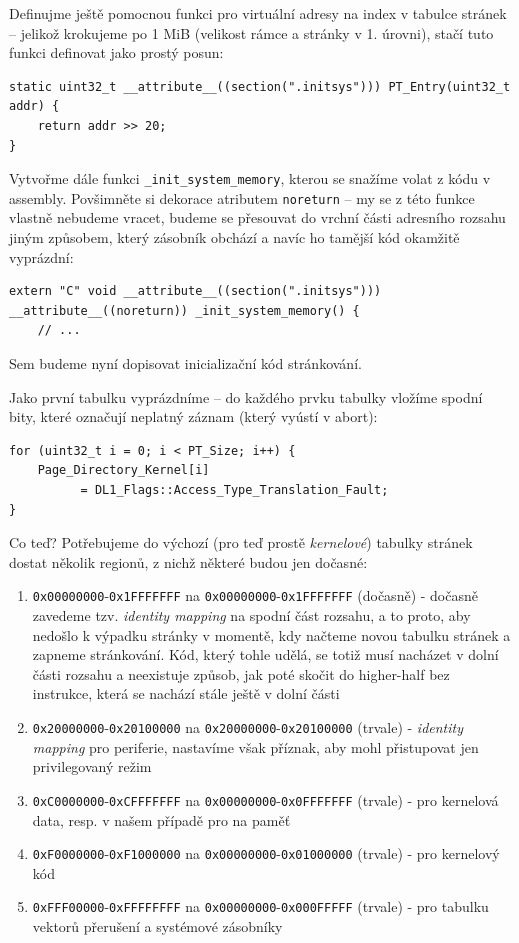 \documentclass{article}
\begin{document}
Definujme ještě pomocnou funkci pro  virtuální adresy na index v tabulce stránek -- jelikož krokujeme po 1 MiB (velikost rámce a stránky v 1. úrovni), stačí tuto funkci definovat jako prostý posun:
\begin{lstlisting}
static uint32_t __attribute__((section(".initsys"))) PT_Entry(uint32_t addr) {
	return addr >> 20;
}
\end{lstlisting}

Vytvořme dále funkci {\tt \_init\_system\_memory}, kterou se snažíme volat z kódu v assembly. Povšimněte si dekorace atributem \texttt{noreturn} -- my se z této funkce vlastně nebudeme vracet, budeme se přesouvat do vrchní části adresního rozsahu jiným způsobem, který zásobník obchází a navíc ho tamější kód okamžitě vyprázdní:
\begin{lstlisting}
extern "C" void __attribute__((section(".initsys"))) __attribute__((noreturn)) _init_system_memory() {
	// ...
\end{lstlisting}

Sem budeme nyní dopisovat inicializační kód stránkování.

Jako první tabulku vyprázdníme -- do každého prvku tabulky vložíme spodní bity, které označují neplatný záznam (který vyústí v abort):
\begin{lstlisting}
for (uint32_t i = 0; i < PT_Size; i++) {
    Page_Directory_Kernel[i]
          = DL1_Flags::Access_Type_Translation_Fault;
}
\end{lstlisting}

Co teď? Potřebujeme do výchozí (pro teď prostě \emph{kernelové}) tabulky stránek dostat několik regionů, z nichž některé budou jen dočasné:
\begin{enumerate}
	\item {\tt 0x00000000}-{\tt 0x1FFFFFFF} na {\tt 0x00000000}-{\tt 0x1FFFFFFF} (dočasně) - dočasně zavedeme tzv. \emph{identity mapping} na spodní část rozsahu, a to proto, aby nedošlo k výpadku stránky v momentě, kdy načteme novou tabulku stránek a zapneme stránkování. Kód, který tohle udělá, se totiž musí nacházet v dolní části rozsahu a neexistuje způsob, jak poté skočit do higher-half bez instrukce, která se nachází stále ještě v dolní části
	\item {\tt 0x20000000}-{\tt 0x20100000} na {\tt 0x20000000}-{\tt 0x20100000} (trvale) - \emph{identity mapping} pro periferie, nastavíme však příznak, aby mohl přistupovat jen privilegovaný režim
	\item {\tt 0xC0000000}-{\tt 0xCFFFFFFF} na {\tt 0x00000000}-{\tt 0x0FFFFFFF} (trvale) - pro kernelová data, resp. v našem případě pro  na paměť
	\item {\tt 0xF0000000}-{\tt 0xF1000000} na {\tt 0x00000000}-{\tt 0x01000000} (trvale) - pro kernelový kód
	\item {\tt 0xFFF00000}-{\tt 0xFFFFFFFF} na {\tt 0x00000000}-{\tt 0x000FFFFF} (trvale) - pro tabulku vektorů přerušení a systémové zásobníky
\end{enumerate}
\end{document}
